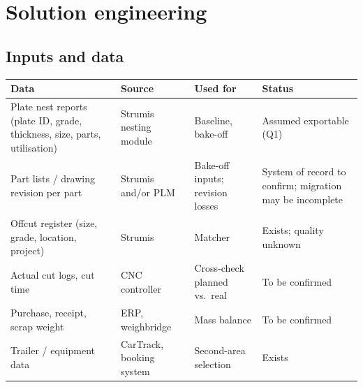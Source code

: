 \documentclass[10pt,a4paper]{article}
\begin{document}
\section{Solution engineering}
\begin{center}
\end{center}

\subsection{Inputs and data}
\small
\begin{tabular}{@{}P{4.4cm}P{3.8cm}P{4.2cm}P{3.1cm}@{}}
\toprule
\textbf{Data} & \textbf{Source} & \textbf{Used for} & \textbf{Status} \\
\midrule
Plate nest reports (plate ID, grade, thickness, size, parts, utilisation) & Strumis nesting module & Baseline, bake-off & Assumed exportable (Q1) \\
Part lists / drawing revision per part & Strumis and/or PLM & Bake-off inputs; revision losses & System of record to confirm; migration may be incomplete \\
Offcut register (size, grade, location, project) & Strumis & Matcher & Exists; quality unknown \\
Actual cut logs, cut time & CNC controller & Cross-check planned vs.\ real & To be confirmed \\
Purchase, receipt, scrap weight & ERP, weighbridge & Mass balance & To be confirmed \\
Trailer / equipment data & CarTrack, booking system & Second-area selection & Exists \\
\bottomrule
\end{tabular}
\normalsize
\end{document}
